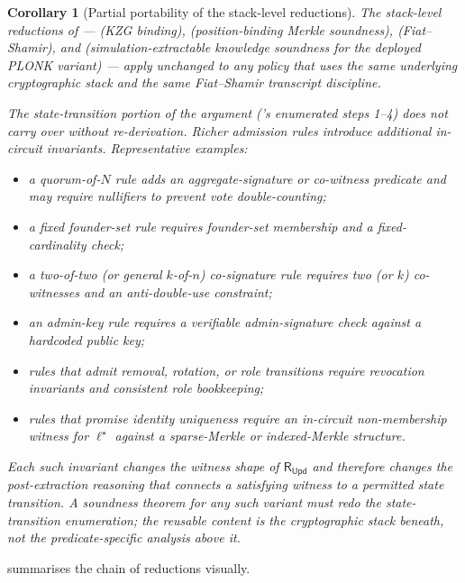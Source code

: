 \documentclass[11pt,a4paper]{article}
\theoremstyle{plain}
\newtheorem{corollary}{Corollary}
\theoremstyle{definition}
\newcommand{\RUpd}{\mathsf{R}_{\mathsf{Upd}}}
\begin{document}
\begin{corollary}[Partial portability of the stack-level reductions]
\label{cor:family}
The \emph{stack-level} reductions of  ---
 (KZG binding), 
(position-binding Merkle soundness), 
(Fiat--Shamir), and 
(simulation-extractable knowledge soundness for the deployed
PLONK variant) --- apply unchanged to any policy that uses the
same underlying cryptographic stack and the same Fiat--Shamir
transcript discipline.

The \emph{state-transition} portion of the argument
('s enumerated steps 1--4) does \emph{not} carry
over without re-derivation. Richer admission rules introduce
additional in-circuit invariants. Representative examples:
\begin{itemize}[leftmargin=2em]
  \item a \emph{quorum-of-$N$} rule adds an aggregate-signature
    or co-witness predicate and may require nullifiers to
    prevent vote double-counting;
  \item a \emph{fixed founder-set} rule requires founder-set
    membership and a fixed-cardinality check;
  \item a \emph{two-of-two} (or general $k$-of-$n$) co-signature
    rule requires two (or $k$) co-witnesses and an
    anti-double-use constraint;
  \item an \emph{admin-key} rule requires a verifiable
    admin-signature check against a hardcoded public key;
  \item rules that admit \emph{removal}, \emph{rotation}, or
    \emph{role transitions} require revocation invariants and
    consistent role bookkeeping;
  \item rules that promise \emph{identity uniqueness} require
    an in-circuit non-membership witness for $\ell^{\star}$
    against a sparse-Merkle or indexed-Merkle structure.
\end{itemize}
Each such invariant changes the witness shape of $\RUpd$ and
therefore changes the post-extraction reasoning that connects a
satisfying witness to a permitted state transition. A soundness
theorem for any such variant must redo the state-transition
enumeration; the reusable content is the cryptographic stack
beneath, not the predicate-specific analysis above it.
\end{corollary}

 summarises the chain of reductions visually.
\end{document}
